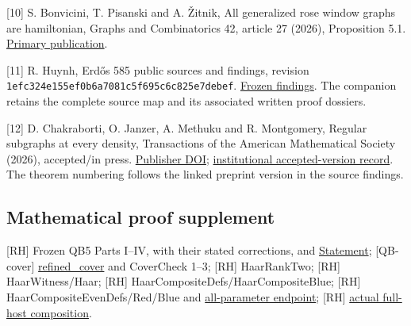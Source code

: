 \documentclass[
  11pt,
]{article}
\begin{document}
{[}10{]} S. Bonvicini, T. Pisanski and A. Žitnik, All generalized rose
window graphs are hamiltonian, Graphs and Combinatorics 42, article 27
(2026), Proposition 5.1.
\href{https://doi.org/10.1007/s00373-026-03016-w}{Primary publication}.

{[}11{]} R. Huynh, Erdős 585 public sources and findings, revision
\texttt{1efc324e155ef0b6a7081c5f695c6c825e7debef}.
\href{https://github.com/roberthuynh/erdos-585/blob/1efc324e155ef0b6a7081c5f695c6c825e7debef/findings/FINDINGS.md}{Frozen
findings}. The companion retains the complete source map and its
associated written proof dossiers.

{[}12{]} D. Chakraborti, O. Janzer, A. Methuku and R. Montgomery,
Regular subgraphs at every density, Transactions of the American
Mathematical Society (2026), accepted/in press.
\href{https://doi.org/10.1090/tran/9694}{Publisher DOI};
\href{https://wrap.warwick.ac.uk/id/eprint/194663/}{institutional
accepted-version record}. The theorem numbering follows the linked
preprint version in the source findings.

\subsection{Mathematical proof
supplement}\label{mathematical-proof-supplement}

{[}RH{]} Frozen QB5 Parts I--IV, with their stated corrections, and
\href{https://github.com/roberthuynh/erdos-585/blob/1efc324e155ef0b6a7081c5f695c6c825e7debef/Openmath/Proofs/QB5/Statement.lean\#L42}{Statement};
{[}QB-cover{]}
\href{https://github.com/roberthuynh/erdos-585/blob/1efc324e155ef0b6a7081c5f695c6c825e7debef/Openmath/Proofs/QB5/Cover.lean\#L800}{refined\_cover}
and CoverCheck 1--3; {[}RH{]} HaarRankTwo; {[}RH{]} HaarWitness/Haar;
{[}RH{]} HaarCompositeDefs/HaarCompositeBlue; {[}RH{]}
HaarCompositeEvenDefs/Red/Blue and
\href{https://github.com/roberthuynh/erdos-585/blob/1efc324e155ef0b6a7081c5f695c6c825e7debef/findings/supplement/lean/Openmath/Proofs/HaarCompositeEven.lean\#L441}{all-parameter
endpoint}; {[}RH{]}
\href{https://github.com/alejandrozu/openmath-2026-judging/blob/70c5ec3107658182f22c207d4c50f53f9cb3e602/robert-review-2026-10-07/lean/CycleComposition.lean\#L171}{actual
full-host composition}.
\end{document}
